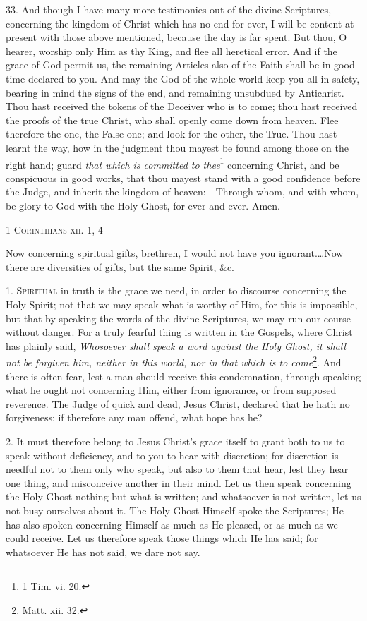 33. And though I have many more testimonies out of the divine Scriptures, concerning the kingdom of Christ which has no end for ever, I will be content at present with those above mentioned, because the day is far spent. But thou, O hearer, worship only Him as thy King, and flee all heretical error. And if the grace of God permit us, the remaining Articles also of the Faith shall be in good time declared to you. And may the God of the whole world keep you all in safety, bearing in mind the signs of the end, and remaining unsubdued by Antichrist. Thou hast received the tokens of the Deceiver who is to come; thou hast received the proofs of the true Christ, who shall openly come down from heaven. Flee therefore the one, the False one; and look for the other, the True. Thou hast learnt the way, how in the judgment thou mayest be found among those on the right hand; guard \emph{that which is committed to thee}\footnote{1 Tim. vi. 20.} concerning Christ, and be conspicuous in good works, that thou mayest stand with a good confidence before the Judge, and inherit the kingdom of heaven:—Through whom, and with whom, be glory to God with the Holy Ghost, for ever and ever. Amen.


\textsc{1 Corinthians xii. 1, 4}

Now concerning spiritual gifts, brethren, I would not have you ignorant.…Now there are diversities of gifts, but the same Spirit, \&c.

1. \textsc{Spiritual} in truth is the grace we need, in order to discourse concerning the Holy Spirit; not that we may speak what is worthy of Him, for this is impossible, but that by speaking the words of the divine Scriptures, we may run our course without danger. For a truly fearful thing is written in the Gospels, where Christ has plainly said, \emph{Whosoever shall speak a word against the Holy Ghost, it shall not be forgiven him, neither in this world, nor in that which is to come}\footnote{Matt. xii. 32.}. And there is often fear, lest a man should receive this condemnation, through speaking what he ought not concerning Him, either from ignorance, or from supposed reverence. The Judge of quick and dead, Jesus Christ, declared that he hath no forgiveness; if therefore any man offend, what hope has he?

2. It must therefore belong to Jesus Christ’s grace itself to grant both to us to speak without deficiency, and to you to hear with discretion; for discretion is needful not to them only who speak, but also to them that hear, lest they hear one thing, and misconceive another in their mind. Let us then speak concerning the Holy Ghost nothing but what is written; and whatsoever is not written, let us not busy ourselves about it. The Holy Ghost Himself spoke the Scriptures; He has also spoken concerning Himself as much as He pleased, or as much as we could receive. Let us therefore speak those things which He has said; for whatsoever He has not said, we dare not say.

